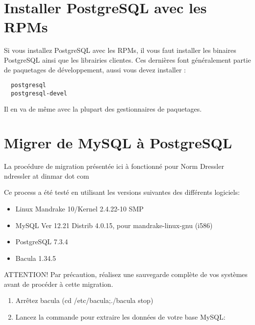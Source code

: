 {{{{\section{Installer PostgreSQL avec les RPMs}
Si vous installez PostgreSQL avec les RPMs, il vous faut installer les 
binaires PostgreSQL ainsi que les librairies clientes. Ces derni\`eres font 
g\'en\'eralement partie de paquetages de d\'eveloppement, aussi vous devez installer :

\footnotesize
\begin{verbatim}
  postgresql
  postgresql-devel
\end{verbatim}
\normalsize

Il en va de m\^eme avec la plupart des gestionnaires de paquetages.

\section{Migrer de MySQL \`a PostgreSQL}

La proc\'edure de migration pr\'esent\'ee ici \`a fonctionn\'e pour Norm
Dressler \lt{}ndressler at dinmar dot com\gt{} 

Ce process a \'et\'e test\'e en utilisant les versions suivantes des
diff\'erents logiciels: 

\begin{itemize}
\item Linux Mandrake 10/Kernel 2.4.22-10 SMP 
\item MySQL Ver 12.21 Distrib 4.0.15, pour mandrake-linux-gnu (i586) 
\item PostgreSQL 7.3.4 
\item Bacula 1.34.5 
   \end{itemize}

ATTENTION! Par pr\'ecaution, r\'ealisez une sauvegarde compl\`ete de vos
syst\`emes avant de proc\'eder \`a cette migration. 

\begin{enumerate}
\item Arr\^etez bacula (cd /etc/bacula;./bacula stop)  
\item Lancez la commande pour extraire les donn\'ees de votre base MySQL:  


\end{enumerate}}}}}
